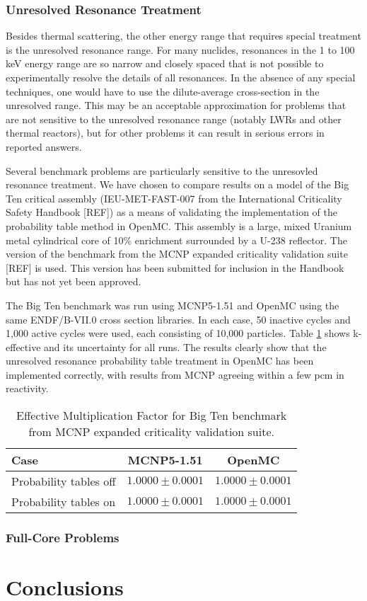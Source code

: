 \documentclass{elsarticle}
\begin{document}
\subsubsection{Unresolved Resonance Treatment}

Besides thermal scattering, the other energy range that requires special
treatment is the unresolved resonance range. For many nuclides, resonances in
the 1 to 100 keV energy range are so narrow and closely spaced that is not
possible to experimentally resolve the details of all resonances. In the absence
of any special techniques, one would have to use the dilute-average
cross-section in the unresolved range. This may be an acceptable approximation
for problems that are not sensitive to the unresolved resonance range (notably
LWRs and other thermal reactors), but for other problems it can result in
serious errors in reported answers.

Several benchmark problems are particularly sensitive to the unresovled
resonance treatment. We have chosen to compare results on a model of the Big Ten
critical assembly (IEU-MET-FAST-007 from the International Criticality Safety
Handbook [REF]) as a means of validating the implementation of the probability
table method in OpenMC. This assembly is a large, mixed Uranium metal
cylindrical core of 10\% enrichment surrounded by a U-238 reflector. The version
of the benchmark from the MCNP expanded criticality validation suite [REF] is
used. This version has been submitted for inclusion in the Handbook but has not
yet been approved.

The Big Ten benchmark was run using MCNP5-1.51 and OpenMC using the same
ENDF/B-VII.0 cross section libraries. In each case, 50 inactive cycles and 1,000
active cycles were used, each consisting of 10,000 particles. Table
\ref{tab:bigten} shows k-effective and its uncertainty for all runs. The results
clearly show that the unresolved resonance probability table treatment in OpenMC
has been implemented correctly, with results from MCNP agreeing within a few pcm
in reactivity.

\begin{table}
  \caption{Effective Multiplication Factor for Big Ten benchmark from MCNP
    expanded criticality validation suite.}
  \label{tab:bigten}
  \begin{center}
  \begin{tabular}{ l c c }
    \hline
    Case & MCNP5-1.51 & OpenMC \\
    \hline
    Probability tables off & $1.0000 \pm 0.0001$ & $1.0000 \pm 0.0001$ \\
    Probability tables on  & $1.0000 \pm 0.0001$ & $1.0000 \pm 0.0001$ \\
    \hline
  \end{tabular}
  \end{center}
\end{table}

\subsubsection{Full-Core Problems}

\section{Conclusions}



\end{document}
